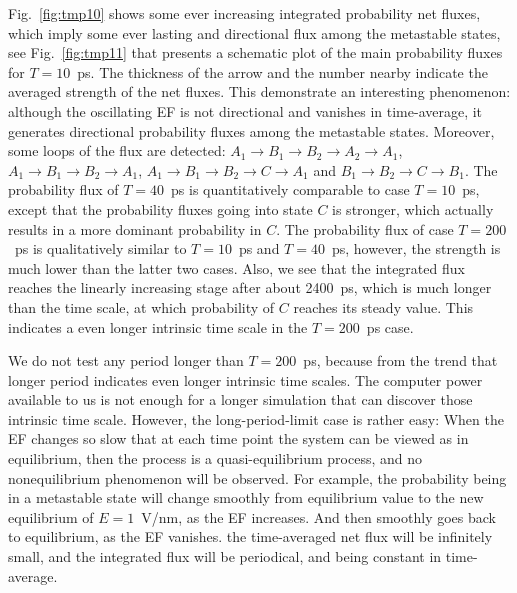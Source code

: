 \documentclass[a4paper,preprint,unsortedaddress,onecolumn]{revtex4-1}
\begin{document}
Fig.~\ref{fig:tmp10} shows some ever increasing
integrated probability net fluxes, which imply some ever lasting and directional
flux among the metastable states, see
Fig.~\ref{fig:tmp11} that presents a schematic plot of the main probability
fluxes for $T=10$~ps.
The thickness of the arrow and the number nearby indicate
the averaged strength of the net fluxes.
This demonstrate an interesting phenomenon: although
the oscillating EF is not directional and vanishes in time-average,
it generates directional probability fluxes among the metastable states.
Moreover, some loops of the flux are detected: $A_1 \rightarrow B_1
\rightarrow B_2 \rightarrow A_2 \rightarrow A_1$, $A_1 \rightarrow B_1
\rightarrow B_2 \rightarrow A_1$,  $A_1 \rightarrow B_1
\rightarrow B_2 \rightarrow C \rightarrow A_1$ and $B_1
\rightarrow B_2 \rightarrow C \rightarrow B_1$.
The probability flux of $T=40$~ps is quantitatively
comparable to case $T=10$~ps, except that the probability fluxes
going into state $C$ is stronger, which actually results in
a more dominant probability in $C$.
The probability flux of case $T=200$~ps is qualitatively
similar to $T=10$~ps and $T=40$~ps, however,
the strength is much lower than the latter two cases.
Also, we see that the integrated flux reaches the linearly increasing
stage after about 2400~ps, which is much longer than the time scale,
at which probability of $C$ reaches its steady value. This indicates
a even longer intrinsic time scale in the $T=200$~ps case.

We do not test any period longer than $T=200$~ps, because
from the trend that longer period indicates even longer intrinsic time scales.
The computer power available to us is not enough for a longer
simulation that can discover those intrinsic time scale.
However, the long-period-limit case is rather easy: When
the EF changes so slow that at each time point the system
can be viewed as in equilibrium, then the process is a quasi-equilibrium
process, and no nonequilibrium phenomenon will be observed. For example,
the probability being in a  metastable state will change
smoothly from equilibrium value to the new equilibrium of $E=1$~V/nm, as
the EF increases.
And then smoothly goes back to equilibrium, as the EF vanishes.
the time-averaged net flux will be infinitely small,
and the integrated flux will be periodical, and being constant in time-average.


\end{document}
